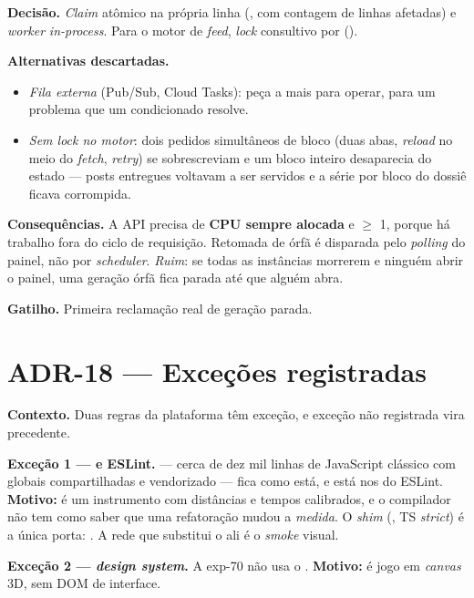 \textbf{Decisão.} \emph{Claim} atômico na própria linha
(, com contagem de linhas afetadas) e
\emph{worker} \emph{in-process}. Para o motor de \emph{feed}, \emph{lock}
consultivo por  ().

\textbf{Alternativas descartadas.}
\begin{itemize}
  \item \emph{Fila externa} (Pub/Sub, Cloud Tasks): peça a mais para operar, para
    um problema que um  condicionado resolve.
  \item \emph{Sem \emph{lock} no motor}: dois pedidos simultâneos de bloco (duas
    abas, \emph{reload} no meio do \emph{fetch}, \emph{retry}) se sobrescreviam e
    um bloco inteiro desaparecia do estado --- posts entregues voltavam a ser
    servidos e a série por bloco do dossiê ficava corrompida.
\end{itemize}

\textbf{Consequências.} A API precisa de \textbf{CPU sempre alocada} e
 $\geq$ 1, porque há trabalho fora do ciclo de requisição.
Retomada de órfã é disparada pelo \emph{polling} do painel, não por
\emph{scheduler}. \emph{Ruim}: se todas as instâncias morrerem e ninguém abrir o
painel, uma geração órfã fica parada até que alguém abra.

\textbf{Gatilho.} Primeira reclamação real de geração parada.

\section{ADR-18 --- Exceções registradas}

\textbf{Contexto.} Duas regras da plataforma têm exceção, e exceção não
registrada vira precedente.

\textbf{Exceção 1 ---  e ESLint.}
 --- cerca de dez mil
linhas de JavaScript clássico com globais compartilhadas e 
vendorizado --- fica como está, e está nos  do ESLint.
\textbf{Motivo:} é um instrumento com distâncias e tempos calibrados, e o
compilador não tem como saber que uma refatoração mudou a \emph{medida}. O
\emph{shim} (, TS \emph{strict}) é a única porta: . A
rede que substitui o  ali é o \emph{smoke} visual.

\textbf{Exceção 2 --- \emph{design system}.} A exp-70 não usa o
. \textbf{Motivo:} é jogo em \emph{canvas} 3D, sem DOM
de interface.

